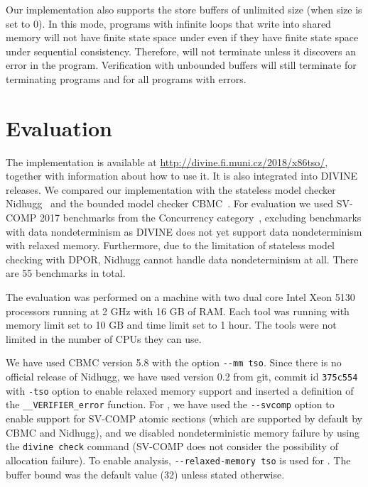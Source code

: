 Our implementation also supports the store buffers of unlimited size (when size
is set to 0). In this mode, programs with infinite loops that write into shared
memory will not have finite state space under \xtso even if they have finite
state space under sequential consistency.
Therefore, \divine will not terminate unless it discovers an error in the
program.
Verification with unbounded buffers will still terminate for terminating
programs and for all programs with errors.


\section{Evaluation} \label{sec:evaluation}

The implementation is available at \url{http://divine.fi.muni.cz/2018/x86tso/}, together with information about how to use it.
It is also integrated into DIVINE releases.
We compared our implementation with the stateless model checker Nidhugg~ and the bounded model checker CBMC~.
For evaluation we used SV-COMP 2017 benchmarks from the Concurrency
category~, excluding benchmarks with data
nondeterminism as
DIVINE does not yet support data nondeterminism with relaxed memory.
Furthermore, due to the limitation of stateless model checking with DPOR,
Nidhugg cannot handle data nondeterminism at all.
There are 55 benchmarks in total.

The evaluation was performed on a machine with two dual core Intel Xeon 5130
processors running at 2 GHz with 16 GB of RAM. Each tool was running with memory
limit set to 10 GB and time limit set to 1 hour. The tools were not limited in
the number of CPUs they can use.

We have used CBMC version 5.8 with the option \texttt{-{}-mm tso}. Since there is no official release of Nidhugg, we have used version 0.2 from git, commit id
\texttt{375c554} with \texttt{-tso} option to enable relaxed memory support and inserted a definition of the \texttt{\_\_VERIFIER\_error} function.
For \divine, we have used the \texttt{-{}-svcomp} option to enable support for SV-COMP atomic sections (which are supported by default by CBMC and Nidhugg), and we disabled nondeterministic memory failure by using the \texttt{divine check} command (SV-COMP does not consider the possibility of allocation failure).
To enable \xtso analysis, \texttt{-{}-relaxed-memory tso} is used for \divine.
The buffer bound was the default value (32) unless stated otherwise.


